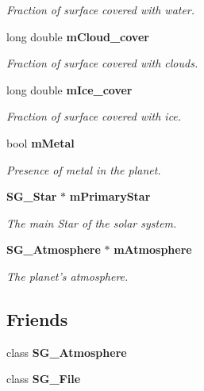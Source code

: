 \begin{CompactItemize}
\begin{CompactList}\small\item\em Fraction of surface covered with water. \item\end{CompactList}\item 
long double {\bf m\-Cloud\_\-cover}\label{class_s_g___planet_p36}

\begin{CompactList}\small\item\em Fraction of surface covered with clouds. \item\end{CompactList}\item 
long double {\bf m\-Ice\_\-cover}\label{class_s_g___planet_p37}

\begin{CompactList}\small\item\em Fraction of surface covered with ice. \item\end{CompactList}\item 
bool {\bf m\-Metal}\label{class_s_g___planet_p38}

\begin{CompactList}\small\item\em Presence of metal in the planet. \item\end{CompactList}\item 
{\bf SG\_\-Star} $\ast$ {\bf m\-Primary\-Star}\label{class_s_g___planet_p39}

\begin{CompactList}\small\item\em The main Star of the solar system. \item\end{CompactList}\item 
{\bf SG\_\-Atmosphere} $\ast$ {\bf m\-Atmosphere}\label{class_s_g___planet_p40}

\begin{CompactList}\small\item\em The planet's atmosphere. \item\end{CompactList}\end{CompactItemize}
\subsection*{Friends}
\begin{CompactItemize}
\item 
class {\bf SG\_\-Atmosphere}\label{class_s_g___planet_n0}

\item 
class {\bf SG\_\-File}\label{class_s_g___planet_n1}

\end{CompactItemize}



